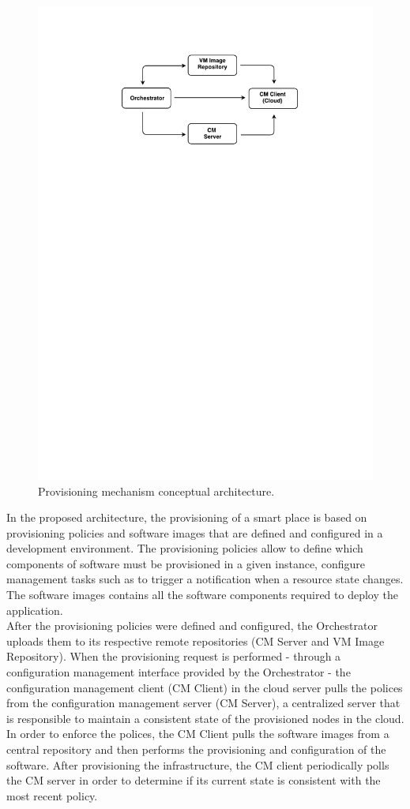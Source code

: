 \begin{figure}[ht!]
  \centering
  \includegraphics[width=.4\textwidth]{./figures/c4t-generic-solution.pdf}
  \caption[Provisioning mechanism conceptual architecture.]{Provisioning mechanism conceptual architecture.}
  \label{fig:provisioning_generic_architecture}
\end{figure}

In the proposed architecture, the provisioning of a smart place is based on provisioning policies and
software images that are defined and configured in a development environment. The provisioning policies
allow to define which components of software must be provisioned in a given instance, configure
management tasks such as to trigger a notification when a resource state changes. The software images
contains all the software components required to deploy the application.\\

After the provisioning policies were defined and configured, the Orchestrator uploads them to its respective
remote repositories (CM Server and VM Image Repository). When the provisioning request is performed -
through a configuration management interface provided by the Orchestrator - the configuration management
client (\gls{CM} Client) in the cloud server pulls the polices from the configuration management server
(\gls{CM} Server), a centralized server that is responsible to maintain a consistent state of the
provisioned nodes in the cloud. In order to enforce the polices, the \gls{CM} Client pulls the software
images from a central repository and then performs the provisioning and configuration of the software.
After provisioning the infrastructure, the CM client periodically polls the CM server in order to
determine if its current state is consistent with the most recent policy.
